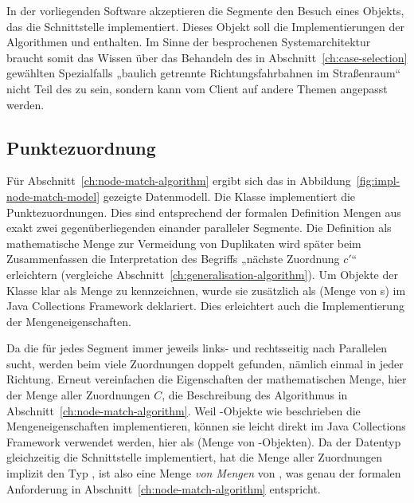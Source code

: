 \documentclass[../main/thesis.tex]{subfiles}
\begin{document}
In der vorliegenden Software akzeptieren die Segmente den Besuch eines Objekts, das die Schnittstelle  implementiert.
Dieses Objekt soll die Implementierungen der Algorithmen  und  enthalten.
Im Sinne der besprochenen Systemarchitektur braucht somit das Wissen über das Behandeln des in Abschnitt~\ref{ch:case-selection} gewählten Spezialfalls „baulich getrennte Richtungsfahrbahnen im Straßenraum“ nicht Teil des  zu sein, sondern kann vom Client auf andere Themen angepasst werden.



\subsection{Punktezuordnung}
\label{ch:impl-node-match}

Für Abschnitt~\ref{ch:node-match-algorithm} ergibt sich das in Abbildung~\ref{fig:impl-node-match-model} gezeigte Datenmodell.
Die Klasse  implementiert die Punktezuordnungen.
Dies sind entsprechend der formalen Definition Mengen aus exakt zwei gegenüberliegenden  einander paralleler Segmente.
Die Definition als mathematische Menge zur Vermeidung von Duplikaten wird später beim Zusammenfassen die Interpretation des Begriffs „nächste Zuordnung $c'$“ erleichtern (vergleiche Abschnitt~\ref{ch:generalisation-algorithm}).
Um Objekte der Klasse  klar als Menge zu kennzeichnen, wurde sie zusätzlich als  (Menge von s) im Java Collections Framework deklariert.
Dies erleichtert auch die Implementierung der Mengeneigenschaften.


Da die  für jedes Segment immer jeweils links- und rechtsseitig nach Parallelen sucht, werden beim  viele Zuordnungen doppelt gefunden, nämlich einmal in jeder Richtung.
Erneut vereinfachen die Eigenschaften der mathematischen Menge, hier der Menge aller Zuordnungen $C$, die Beschreibung des Algorithmus in Abschnitt~\ref{ch:node-match-algorithm}.
Weil -Objekte wie beschrieben die Mengeneigenschaften implementieren, können sie leicht direkt im Java Collections Framework verwendet werden, hier als  (Menge von -Objekten).
Da der Datentyp  gleichzeitig die Schnittstelle  implementiert, hat die Menge aller Zuordnungen implizit den Typ , ist also eine Menge \emph{von Mengen} von , was genau der formalen Anforderung in Abschnitt~\ref{ch:node-match-algorithm} entspricht.
\end{document}
